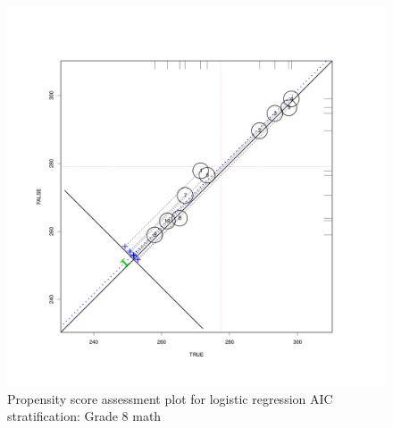 \clearpage
\begin{figure}
\begin{center}
\includegraphics[height=.4\textheight,width=.4\textheight]{../Figures2009/g8math-circpsa10-AIC.pdf}
\caption{Propensity score assessment plot for logistic regression AIC stratification: Grade 8 math}
\end{center}
\end{figure}



